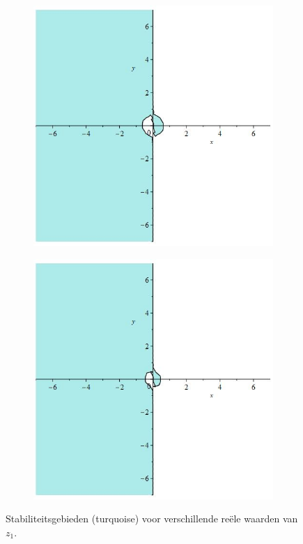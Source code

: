 \documentclass[12pt]{article}
\begin{document}
\begin{figure}[H]
\begin{subfigure}{0.24\textwidth}
    \end{subfigure}
    \begin{subfigure}{0.24\textwidth}
        \includegraphics[width=0.9\linewidth]{stabrks3_12.jpg}
    \end{subfigure}
    \begin{subfigure}{0.24\textwidth}
        \includegraphics[width=0.9\linewidth]{stabrks3_13.jpg}
    \end{subfigure}
    \caption{Stabiliteitsgebieden (turquoise) voor verschillende reële waarden van \(z_1\).}
    \label{fig:stabrks3real}
\end{figure}
\end{document}
